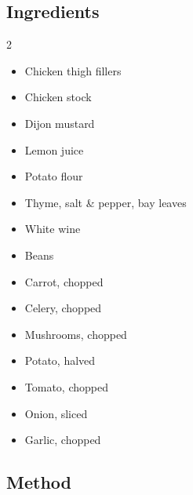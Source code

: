 \documentclass[11pt,a4paper]{article}
\begin{document}
\subsection*{Ingredients}

\begin{multicols}{2}

	\begin{itemize}
		\item Chicken thigh fillers
		\item Chicken stock
		\item Dijon mustard
		\item Lemon juice
		\item Potato flour
		\item Thyme, salt \& pepper, bay leaves
		\item White wine
	\end{itemize}

	\columnbreak

	\begin{itemize}
		\item Beans
		\item Carrot, chopped
		\item Celery, chopped
		\item Mushrooms, chopped
		\item Potato, halved
		\item Tomato, chopped
		\item Onion, sliced
		\item Garlic, chopped
	\end{itemize}

\end{multicols}

\medskip

\subsection*{Method}
\end{document}
